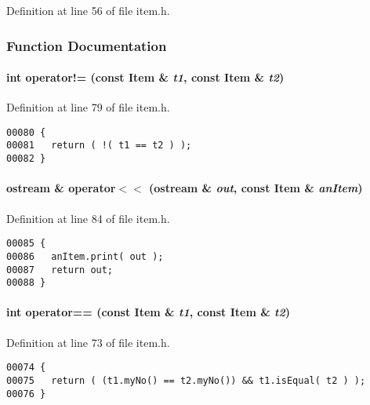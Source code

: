 Definition at line 56 of file item.h.

\subsubsection{Function Documentation}
\label{item.h_a2}
\paragraph{\setlength{\rightskip}{0pt plus 5cm}int operator!= (const {\bf Item} \& {\em t1}, const {\bf Item} \& {\em t2})\hspace{0.3cm}{\tt  [inline]}}\hfill



Definition at line 79 of file item.h.\small\begin{verbatim}00080 {
00081   return ( !( t1 == t2 ) );
00082 }
\end{verbatim}\normalsize 
\label{item.h_a3}
\paragraph{\setlength{\rightskip}{0pt plus 5cm}ostream \& operator$<$$<$ (ostream \& {\em out}, const {\bf Item} \& {\em an\-Item})\hspace{0.3cm}{\tt  [inline]}}\hfill



Definition at line 84 of file item.h.\small\begin{verbatim}00085 {
00086   anItem.print( out );
00087   return out;
00088 }
\end{verbatim}\normalsize 
\label{item.h_a1}
\paragraph{\setlength{\rightskip}{0pt plus 5cm}int operator== (const {\bf Item} \& {\em t1}, const {\bf Item} \& {\em t2})\hspace{0.3cm}{\tt  [inline]}}\hfill



Definition at line 73 of file item.h.\small\begin{verbatim}00074 {
00075   return ( (t1.myNo() == t2.myNo()) && t1.isEqual( t2 ) );
00076 }
\end{verbatim}\normalsize 
